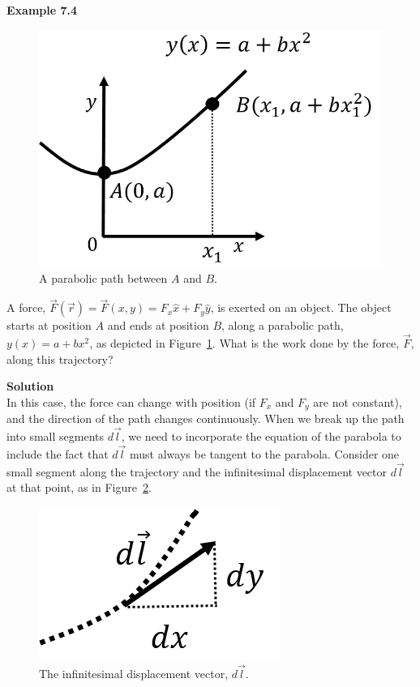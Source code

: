 \begin{framed}
\textbf{Example 7.4}\\
\begin{figure}[!htbp]
\centering
\includegraphics[width=0.4\linewidth]{files/workparabola-d0ed2175e176574cb5fbc15b4d5a2c74.png}
\caption[]{A parabolic path between $A$ and $B$.}
\label{fig:workenergy:workparabola}
\end{figure}

A force, $\vec F(\vec r) = \vec F(x,y) = F_x\hat x + F_y \hat y$,  is exerted on an object. The object starts at position $A$ and ends at position $B$, along a parabolic path, $y(x) = a+bx^2$, as depicted in Figure~\ref{fig:workenergy:workparabola}. What is the work done by the force, $\vec F$, along this trajectory?

\begin{framed}
\textbf{Solution}\\
In this case, the force can change with position (if $F_x$ and $F_y$ are not constant), and the direction of the path changes continuously. When we break up the path into small segments $d\vec l$, we need to incorporate the equation of the parabola to include the fact that $d\vec l$ must always be tangent to the parabola. Consider one small segment along the trajectory and the infinitesimal displacement vector $d\vec l$ at that point, as in Figure~\ref{fig:workenergy:workparabola_dr}.

\begin{figure}[!htbp]
\centering
\includegraphics[width=0.3\linewidth]{files/workparabola_dr-759577de91b461f1c08d0dda81a7adc9.png}
\caption[]{The infinitesimal displacement vector, $d\vec l$.}
\label{fig:workenergy:workparabola_dr}
\end{figure}


\end{framed}
\end{framed}
